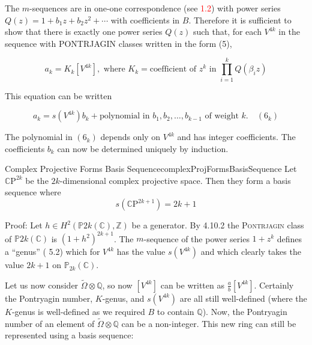 \documentclass{book}
\newcommand{\Q}{{\mathbb{Q}}}
\newcommand{\CP}{\mathbb{C}\mathrm{P}}
\begin{document}
\begin{Proof}
  The $m$-sequences are in one-one correspondence (see \textcolor{red}{1.2}) with power series $Q(z) = 1 + b_1 z + b_2 z^2 + \cdots$ with coefficients in $B$. Therefore it is sufficient to show that there is exactly one power series $Q(z)$ such that, for each $V^{4k}$ in the sequence with PONTRJAGIN classes written in the form (5),

\[
a_k = K_k[V^{4k}], \text{ where } K_k = \text{coefficient of } z^k \text{ in } \prod_{i=1}^k Q(\beta_i z)
\]

This equation can be written

\[
a_k = s(V^{4k})b_k + \text{polynomial in } b_1, b_2, \ldots, b_{k-1} \text{ of weight } k. \quad (6_k)
\]

The polynomial in $(6_k)$ depends only on $V^{4k}$ and has integer coefficients. The coefficients $b_k$ can now be determined uniquely by induction.
\end{Proof}


\begin{thm}{Complex Projective Forms Basis Sequence}{complexProjFormsBasisSequence}
  Let $\CP^{2k}$ be the $2k$-dimensional complex projective space. Then they form a basis sequence where
  \[
    s(\CP^{2k+1}) = 2k+1
  \]
\end{thm}

\begin{Proof}
  Proof: Let $h \in H^2(\mathbb{P}{2k}(\mathbb{C}), \mathbb{Z})$ be a generator. By {\color{red} 4.10.2} the \textsc{Pontrjagin} class of $\mathbb{P}{2k}(\mathbb{C})$ is $(1 + h^2)^{2k+1}$. The $m$-sequence of the power series $1 + z^k$ defines a ``genus'' ({\color{red} 5.2}) which for $V^{4k}$ has the value $s(V^{4k})$ and which clearly takes the value $2k + 1$ on $\mathbb{P}_{2k}(\mathbb{C})$.
\end{Proof}

Let us now consider $\widetilde{\Omega}\otimes \Q$, so now $[V^{4k}]$ can be written as $\frac{a}{b}[V^{4k}]$.
Certainly the Pontryagin number, $K$-genus, and $s(V^{4k})$ are all still well-defined (where the $K$-genus is
well-defined as we required $B$ to contain $\Q$). Now, the Pontryagin number of an element of
$\widetilde{\Omega}\otimes \Q$ can be a non-integer. This new ring can still be represented using a basis
sequence:
\end{document}
